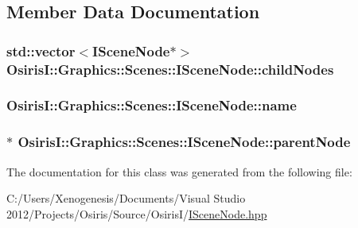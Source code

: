\subsection{Member Data Documentation}
\hypertarget{class_osiris_i_1_1_graphics_1_1_scenes_1_1_i_scene_node_a241abc83a1b837010d52a41c807dfb70}{
\subsubsection[{child\-Nodes}]{\setlength{\rightskip}{0pt plus 5cm}std\-::vector$<${\bf I\-Scene\-Node}$\ast$$>$ Osiris\-I\-::\-Graphics\-::\-Scenes\-::\-I\-Scene\-Node\-::child\-Nodes\hspace{0.3cm}{\ttfamily [protected]}}}\label{class_osiris_i_1_1_graphics_1_1_scenes_1_1_i_scene_node_a241abc83a1b837010d52a41c807dfb70}
\hypertarget{class_osiris_i_1_1_graphics_1_1_scenes_1_1_i_scene_node_a7345dd758e443f8dc613a3aa13046a02}{
\subsubsection[{name}]{ Osiris\-I\-::\-Graphics\-::\-Scenes\-::\-I\-Scene\-Node\-::name\hspace{0.3cm}{\ttfamily [protected]}}}\label{class_osiris_i_1_1_graphics_1_1_scenes_1_1_i_scene_node_a7345dd758e443f8dc613a3aa13046a02}
\hypertarget{class_osiris_i_1_1_graphics_1_1_scenes_1_1_i_scene_node_abe5a4e04324daaa4703958794c5f9ea1}{
\subsubsection[{parent\-Node}]{$\ast$ Osiris\-I\-::\-Graphics\-::\-Scenes\-::\-I\-Scene\-Node\-::parent\-Node\hspace{0.3cm}{\ttfamily [protected]}}}\label{class_osiris_i_1_1_graphics_1_1_scenes_1_1_i_scene_node_abe5a4e04324daaa4703958794c5f9ea1}


The documentation for this class was generated from the following file\-:\begin{DoxyCompactItemize}
\item 
C\-:/\-Users/\-Xenogenesis/\-Documents/\-Visual Studio 2012/\-Projects/\-Osiris/\-Source/\-Osiris\-I/\hyperlink{_i_scene_node_8hpp}{I\-Scene\-Node.\-hpp}\end{DoxyCompactItemize}
